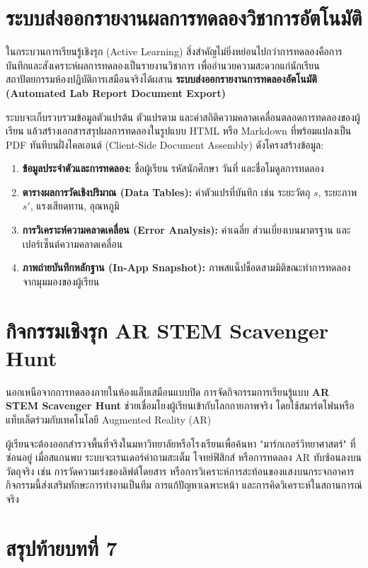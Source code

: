 \section{ระบบส่งออกรายงานผลการทดลองวิชาการอัตโนมัติ}

ในกระบวนการเรียนรู้เชิงรุก (Active Learning) สิ่งสำคัญไม่ยิ่งหย่อนไปกว่าการทดลองคือการบันทึกและสังเคราะห์ผลการทดลองเป็นรายงานวิชาการ เพื่ออำนวยความสะดวกแก่นักเรียน สถาปัตยกรรมห้องปฏิบัติการเสมือนจริงได้ผสาน \textbf{ระบบส่งออกรายงานการทดลองอัตโนมัติ (Automated Lab Report Document Export)}

ระบบจะเก็บรวบรวมข้อมูลตัวแปรต้น ตัวแปรตาม และค่าสถิติความคลาดเคลื่อนตลอดการทดลองของผู้เรียน แล้วสร้างเอกสารสรุปผลการทดลองในรูปแบบ HTML หรือ Markdown ที่พร้อมแปลงเป็น PDF ทันทีบนฝั่งไคลเอนต์ (Client-Side Document Assembly) ดังโครงสร้างข้อมูล:
\begin{enumerate}
    \item \textbf{ข้อมูลประจำตัวและการทดลอง:} ชื่อผู้เรียน รหัสนักศึกษา วันที่ และชื่อโมดูลการทดลอง
    \item \textbf{ตารางผลการวัดเชิงปริมาณ (Data Tables):} ค่าตัวแปรที่บันทึก เช่น ระยะวัตถุ $s$, ระยะภาพ $s'$, แรงเสียดทาน, อุณหภูมิ
    \item \textbf{การวิเคราะห์ความคลาดเคลื่อน (Error Analysis):} ค่าเฉลี่ย ส่วนเบี่ยงเบนมาตรฐาน และเปอร์เซ็นต์ความคลาดเคลื่อน
    \item \textbf{ภาพถ่ายบันทึกหลักฐาน (In-App Snapshot):} ภาพสแน็ปช็อตสามมิติขณะทำการทดลองจากมุมมองของผู้เรียน
\end{enumerate}

\section{กิจกรรมเชิงรุก AR STEM Scavenger Hunt}

นอกเหนือจากการทดลองภายในห้องแล็บเสมือนแบบปิด การจัดกิจกรรมการเรียนรู้แบบ \textbf{AR STEM Scavenger Hunt} ช่วยเชื่อมโยงผู้เรียนเข้ากับโลกกายภาพจริง โดยใช้สมาร์ตโฟนหรือแท็บเล็ตร่วมกับเทคโนโลยี Augmented Reality (AR)

ผู้เรียนจะต้องออกสำรวจพื้นที่จริงในมหาวิทยาลัยหรือโรงเรียนเพื่อค้นหา "มาร์กเกอร์วิทยาศาสตร์" ที่ซ่อนอยู่ เมื่อสแกนพบ ระบบจะเรนเดอร์คำถามสะเต็ม โจทย์ฟิสิกส์ หรือการทดลอง AR ทับซ้อนลงบนวัตถุจริง เช่น การวัดความเร่งของลิฟต์โดยสาร หรือการวิเคราะห์การสะท้อนของแสงบนกระจกอาคาร กิจกรรมนี้ส่งเสริมทักษะการทำงานเป็นทีม การแก้ปัญหาเฉพาะหน้า และการคิดวิเคราะห์ในสถานการณ์จริง

\clearpage

\section*{สรุปท้ายบทที่ 7}


